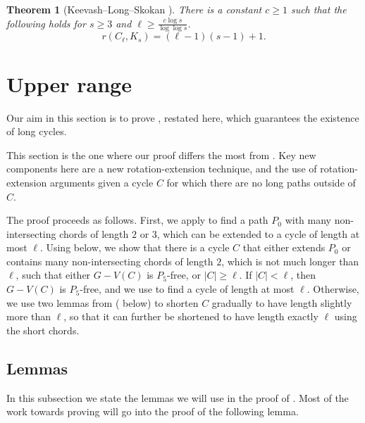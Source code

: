 \documentclass[11pt,english]{article}
\theoremstyle{plain}
\newtheorem{theorem}{Theorem}[section]
\theoremstyle{definition}
\theoremstyle{remark}
\begin{document}
	\begin{theorem}[Keevash--Long--Skokan \cite{keevash2021cycle}] \label{thm:ramsey-keevash}
		There is a constant $c \ge 1$ such that the following holds for $s \ge 3$ and $\ell \ge \frac{c \log s}{\log \log s}$.
		\begin{equation*}
			r(C_{\ell}, K_s) = (\ell-1)(s-1) + 1.
		\end{equation*}
	\end{theorem}

\section{Upper range} \label{sec:upper}

	Our aim in this section is to prove , restated here, which guarantees the existence of long cycles.
	\lemUpperRange*

	This section is the one where our proof differs the most from \cite{draganic2023chvatal}. Key new components here are a new rotation-extension technique, and the use of rotation-extension arguments given a cycle $C$ for which there are no long paths outside of $C$.

	The proof proceeds as follows.
	First, we apply  to find a path $P_0$ with many non-intersecting chords of length $2$ or $3$, which can be extended to a cycle of length at most $\ell$. Using  below, we show that there is a cycle $C$ that either extends $P_0$ or contains many non-intersecting chords of length $2$, which is not much longer than $\ell$, such that either $G - V(C)$ is $P_5$-free, or $|C| \ge \ell$.
	If $|C| < \ell$, then $G - V(C)$ is $P_5$-free, and we use  to find a cycle of length at most $\ell$. Otherwise, we use two lemmas from \cite{draganic2022pancyclicity,draganic2023chvatal} ( below) to shorten $C$ gradually to have length slightly more than $\ell$, so that it can further be shortened to have length exactly $\ell$ using the short chords.

	\subsection{Lemmas}
		In this subsection we state the lemmas we will use in the proof of .
		Most of the work towards proving  will go into the proof of the following lemma. 
\end{document}
